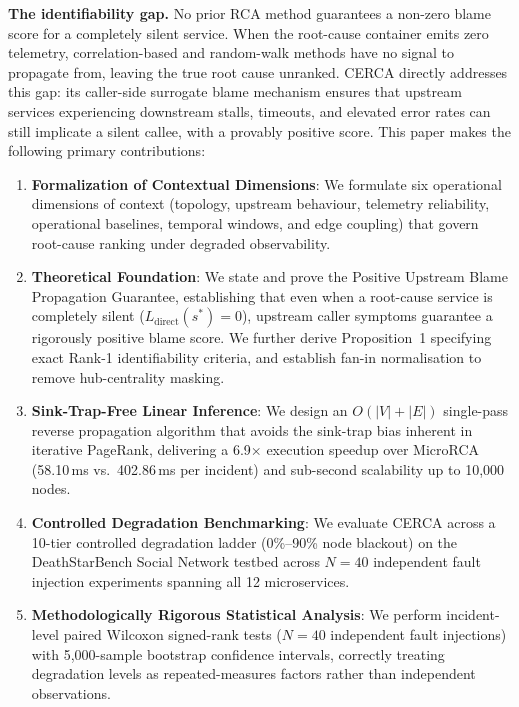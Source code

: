 \documentclass[conference]{IEEEtran}
\begin{document}
\textbf{The identifiability gap.} No prior RCA method guarantees a non-zero blame score for a completely silent service. When the root-cause container emits zero telemetry, correlation-based and random-walk methods have no signal to propagate from, leaving the true root cause unranked. CERCA directly addresses this gap: its caller-side surrogate blame mechanism ensures that upstream services experiencing downstream stalls, timeouts, and elevated error rates can still implicate a silent callee, with a provably positive score. This paper makes the following primary contributions:
\begin{enumerate}
    \item \textbf{Formalization of Contextual Dimensions}: We formulate six operational dimensions of context (topology, upstream behaviour, telemetry reliability, operational baselines, temporal windows, and edge coupling) that govern root-cause ranking under degraded observability.
    \item \textbf{Theoretical Foundation}: We state and prove the Positive Upstream Blame Propagation Guarantee, establishing that even when a root-cause service is completely silent ($L_{\mathrm{direct}}(s^*) = 0$), upstream caller symptoms guarantee a rigorously positive blame score. We further derive Proposition~1 specifying exact Rank-1 identifiability criteria, and establish fan-in normalisation to remove hub-centrality masking.
    \item \textbf{Sink-Trap-Free Linear Inference}: We design an $O(|V| + |E|)$ single-pass reverse propagation algorithm that avoids the sink-trap bias inherent in iterative PageRank, delivering a 6.9$\times$ execution speedup over MicroRCA (58.10\,ms vs.\ 402.86\,ms per incident) and sub-second scalability up to 10{,}000 nodes.
    \item \textbf{Controlled Degradation Benchmarking}: We evaluate CERCA across a 10-tier controlled degradation ladder (0\%--90\% node blackout) on the DeathStarBench Social Network testbed across $N = 40$ independent fault injection experiments spanning all 12 microservices.
    \item \textbf{Methodologically Rigorous Statistical Analysis}: We perform incident-level paired Wilcoxon signed-rank tests ($N = 40$ independent fault injections) with 5,000-sample bootstrap confidence intervals, correctly treating degradation levels as repeated-measures factors rather than independent observations.
\end{enumerate}

\end{document}
